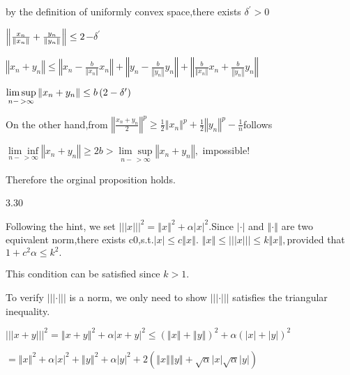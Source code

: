 \documentclass{article}
\begin{document}
by the definition of uniformly convex space,there exists $\delta ^{\prime }>0
$

$\left\Vert \frac{x_{n}}{\left\Vert x_{n}\right\Vert }+\frac{y_{n}}{%
\left\Vert y_{n}\right\Vert }\right\Vert \leq 2$\bigskip $-\delta ^{\prime }$

$\left\Vert x_{n}+y_{n}\right\Vert \leq \left\Vert x_{n}-\frac{b}{\left\Vert
x_{n}\right\Vert }x_{n}\right\Vert +\left\Vert y_{n}-\frac{b}{\left\Vert
y_{n}\right\Vert }y_{n}\right\Vert +\left\Vert \frac{b}{\left\Vert
x_{n}\right\Vert }x_{n}+\frac{b}{\left\Vert y_{n}\right\Vert }%
y_{n}\right\Vert $

$\underset{n-\,>\infty }{\lim \sup }\left\Vert x_{n}+y_{n}\right\Vert \leq
b\left( 2\bigskip -\delta ^{\prime }\right) $

On the other hand,from $\left\Vert \frac{x_{n}+y_{n}}{2}\right\Vert ^{p}\geq 
\frac{1}{2}\left\Vert x_{n}\right\Vert ^{p}+\frac{1}{2}\left\Vert
y_{n}\right\Vert ^{p}-\frac{1}{n}$follows

$\underset{n-\,>\infty }{\lim \inf }\left\Vert x_{n}+y_{n}\right\Vert \geq
2b>\underset{n-\,>\infty }{\lim \sup }\left\Vert x_{n}+y_{n}\right\Vert ,$%
impossible!

Therefore the orginal proposition holds.

3.30

Following the hint, we set $|||x|||^{2}=\left\Vert x\right\Vert ^{2}+\alpha
|x|^{2}.$Since $\left\vert \cdot \right\vert $ and $\left\Vert \cdot
\right\Vert $ are two equivalent norm,there exists c\TEXTsymbol{>}0,s.t.$%
\left\vert x\right\vert \leq c\left\Vert x\right\Vert .$ $\left\Vert
x\right\Vert \leq |||x|||\leq k\left\Vert x\right\Vert ,$provided that $%
1+c^{2}\alpha \leq k^{2}.$

This condition can be satisfied since $k>1.$

\bigskip 

To verify $|||\cdot |||$ is a norm, we only need to show $|||\cdot |||$
satisfies the triangular inequality.

$|||x+y|||^{2}=\left\Vert x+y\right\Vert ^{2}+\alpha \left\vert
x+y\right\vert ^{2}\leq \left( \left\Vert x\right\Vert +\left\Vert
y\right\Vert \right) ^{2}+\alpha \left( \left\vert x\right\vert +\left\vert
y\right\vert \right) ^{2}$

$=\left\Vert x\right\Vert ^{2}+\alpha \left\vert x\right\vert
^{2}+\left\Vert y\right\Vert ^{2}+\alpha \left\vert y\right\vert
^{2}+2\left( \left\Vert x\right\Vert \left\Vert y\right\Vert +\sqrt{\alpha }%
\left\vert x\right\vert \sqrt{\alpha }\left\vert y\right\vert \right) $
\end{document}
